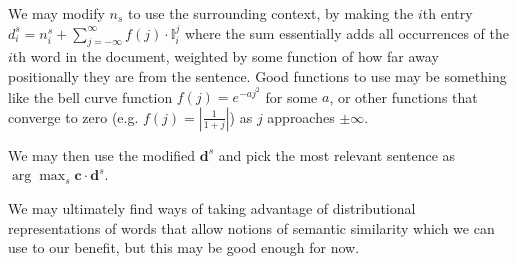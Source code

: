 \documentclass{article}
\begin{document}
We may modify $n_s$ to use the surrounding context, by making the $i$th entry $d^s_i = n^s_i + \sum_{j=-\infty}^\infty f(j) \cdot \mathbb{I}_i^j$ where the sum essentially adds all occurrences of the $i$th word in the document, weighted by some function of how far away positionally they are from the sentence.  Good functions to use may be something like the bell curve function $f(j) = e^{-aj^2}$ for some $a$, or other functions that converge to zero (e.g. $f(j) = |\frac{1}{1+j}|$) as $j$ approaches $\pm \infty$.

We may then use the modified $\mathbf{d}^s$ and pick the most relevant sentence as $\arg\max_s \mathbf{c} \cdot \mathbf{d}^s$.

We may ultimately find ways of taking advantage of distributional representations of words that allow notions of semantic similarity which we can use to our benefit, but this may be good enough for now.
\end{document}
